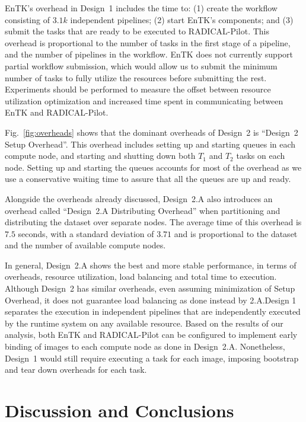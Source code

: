 EnTK's overhead in Design~1 includes the time to: (1) create the workflow 
consisting of $3.1k$ independent pipelines; (2) start EnTK's components; and 
(3) submit the tasks that are ready to be executed to RADICAL-Pilot. This 
overhead is proportional to the number of tasks in the first stage of a 
pipeline, and the number of pipelines in the workflow. EnTK does not currently 
support partial workflow submission, which would allow us to submit the 
minimum number of tasks to fully utilize the resources before submitting the 
rest. Experiments should be performed to measure the offset between resource 
utilization optimization and increased time spent in communicating between 
EnTK and RADICAL-Pilot.

Fig.~\ref{fig:overheads} shows that the dominant overheads of Design~2 is 
``Design~2 Setup Overhead''. This overhead includes setting up and starting 
queues in each compute node, and starting and shutting down both $T_{1}$ and 
$T_{2}$ tasks on each node. Setting up and starting the queues accounts for 
most of the overhead as we use a conservative waiting time to assure that all 
the queues are up and ready.

Alongside the overheads already discussed, Design~2.A also introduces an 
overhead called ``Design~2.A Distributing Overhead'' when partitioning and 
distributing the dataset over separate nodes. The average time of this 
overhead is $7.5$ seconds, with a standard deviation of $3.71$ and is 
proportional to the dataset and the number of available compute nodes.

In general, Design~2.A shows the best and more stable performance, in terms of 
overheads, resource utilization, load balancing and total time to execution.
Although Design~2 has similar overheads, even assuming minimization of Setup 
Overhead, it does not guarantee load balancing as done instead by 2.A.Design 1 
separates the execution in independent pipelines that are independently 
executed by the runtime system on any available resource. Based on the results 
of our analysis, both EnTK and RADICAL-Pilot can be configured to implement 
early binding of images to each compute node as done in Design~2.A.
Nonetheless, Design~1 would still require executing a task for each image, 
imposing bootstrap and tear down overheads for each task.

\section{Discussion and Conclusions}
\label{sec:des_concl}

